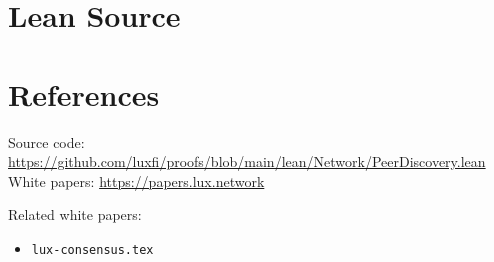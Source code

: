 \documentclass[11pt]{article}
\begin{document}
\section{Lean Source}


\section{References}
\noindent Source code: \url{https://github.com/luxfi/proofs/blob/main/lean/Network/PeerDiscovery.lean}\\
\noindent White papers: \url{https://papers.lux.network}

\noindent Related white papers:
\begin{itemize}
  \item \texttt{lux-consensus.tex}
\end{itemize}
\end{document}
